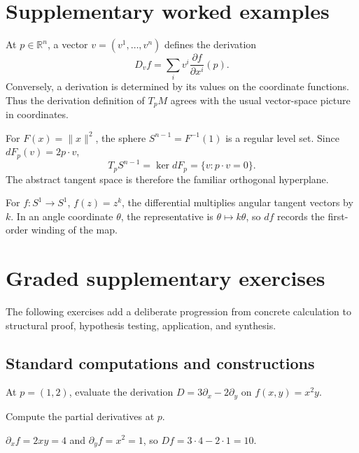 \section{Supplementary worked examples}
\label{sec:vii04-pedagogy}

\begin{example}\label{ex:vii04-ped-01}
At \(p\in\mathbb R^n\), a vector \(v=(v^1,\ldots,v^n)\) defines the derivation
\[
D_v f=\sum_i v^i\frac{\partial f}{\partial x^i}(p).
\]
Conversely, a derivation is determined by its values on the coordinate functions.  Thus the derivation definition of \(T_pM\) agrees with the usual vector-space picture in coordinates.
\end{example}

\begin{example}\label{ex:vii04-ped-02}
For \(F(x)=\lVert x\rVert^2\), the sphere \(S^{n-1}=F^{-1}(1)\) is a regular level set.  Since \(dF_p(v)=2p\cdot v\),
\[
T_pS^{n-1}=\ker dF_p=\{v:p\cdot v=0\}.
\]
The abstract tangent space is therefore the familiar orthogonal hyperplane.
\end{example}

\begin{example}\label{ex:vii04-ped-03}
For \(f:S^1\to S^1\), \(f(z)=z^k\), the differential multiplies angular tangent vectors by \(k\).  In an angle coordinate \(\theta\), the representative is \(\theta\mapsto k\theta\), so \(df\) records the first-order winding of the map.
\end{example}

\section{Graded supplementary exercises}
The following exercises add a deliberate progression from concrete calculation to structural proof, hypothesis testing, application, and synthesis.

\subsection*{Standard computations and constructions}

\begin{exercise}\label{exr:vii04-ped-01}
At \(p=(1,2)\), evaluate the derivation \(D=3\partial_x-2\partial_y\) on \(f(x,y)=x^2y\).
\end{exercise}
\begin{hint}
Compute the partial derivatives at \(p\).
\end{hint}
\begin{solution}
\(\partial_xf=2xy=4\) and \(\partial_yf=x^2=1\), so \(Df=3\cdot4-2\cdot1=10\).
\end{solution}

